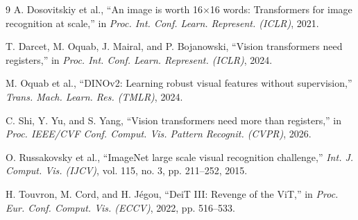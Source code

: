 \documentclass[10pt,twocolumn,letterpaper]{article}
\begin{document}
\balance
\begin{thebibliography}{9}
A. Dosovitskiy et al., ``An image is worth 16$\times$16 words: Transformers for image recognition at scale,'' in \emph{Proc. Int. Conf. Learn. Represent. (ICLR)}, 2021.

T. Darcet, M. Oquab, J. Mairal, and P. Bojanowski, ``Vision transformers need registers,'' in \emph{Proc. Int. Conf. Learn. Represent. (ICLR)}, 2024.

M. Oquab et al., ``DINOv2: Learning robust visual features without supervision,'' \emph{Trans. Mach. Learn. Res. (TMLR)}, 2024.

C. Shi, Y. Yu, and S. Yang, ``Vision transformers need more than registers,'' in \emph{Proc. IEEE/CVF Conf. Comput. Vis. Pattern Recognit. (CVPR)}, 2026.

O. Russakovsky et al., ``ImageNet large scale visual recognition challenge,'' \emph{Int. J. Comput. Vis. (IJCV)}, vol. 115, no. 3, pp. 211--252, 2015.

H. Touvron, M. Cord, and H. J\'egou, ``DeiT III: Revenge of the ViT,'' in \emph{Proc. Eur. Conf. Comput. Vis. (ECCV)}, 2022, pp. 516--533.
\end{thebibliography}
\end{document}
